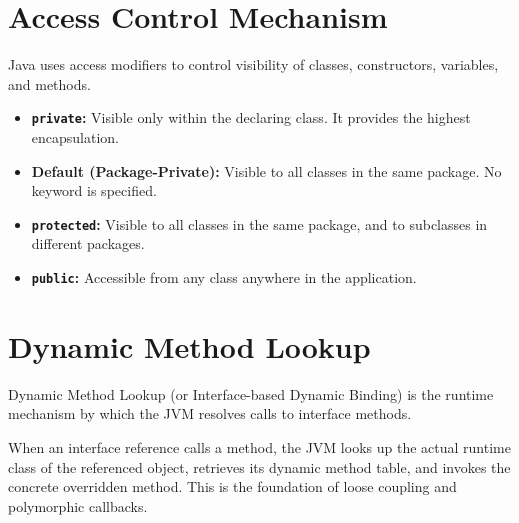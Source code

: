\documentclass[12pt,a4paper]{article}
\begin{document}
\section{Access Control Mechanism}

Java uses access modifiers to control visibility of classes, constructors, variables, and methods.

\begin{itemize}[leftmargin=*, itemsep=3.5pt]
  \item \textbf{\texttt{private}:} Visible only within the declaring class. It provides the highest encapsulation.
  \item \textbf{Default (Package-Private):} Visible to all classes in the same package. No keyword is specified.
  \item \textbf{\texttt{protected}:} Visible to all classes in the same package, and to subclasses in different packages.
  \item \textbf{\texttt{public}:} Accessible from any class anywhere in the application.
\end{itemize}

\section{Dynamic Method Lookup}

Dynamic Method Lookup (or Interface-based Dynamic Binding) is the runtime mechanism by which the JVM resolves calls to interface methods.

\begin{tcolorbox}[defbox, title={\textbf{Interface Callbacks}}]
When an interface reference calls a method, the JVM looks up the actual runtime class of the referenced object, retrieves its dynamic method table, and invokes the concrete overridden method. This is the foundation of loose coupling and polymorphic callbacks.
\end{tcolorbox}
\end{document}
